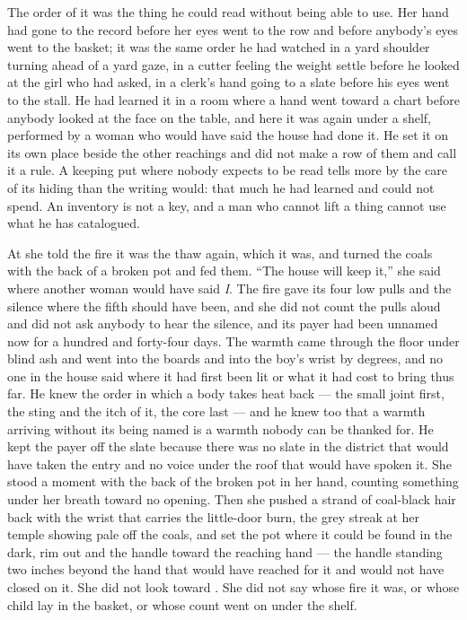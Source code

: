 The order of it was the thing he could read without being able to use. Her hand had gone to the record before her eyes went to the row and before anybody's eyes went to the basket; it was the same order he had watched in a yard shoulder turning ahead of a yard gaze, in a cutter feeling the weight settle before he looked at the girl who had asked, in a clerk's hand going to a slate before his eyes went to the stall. He had learned it in a room where a hand went toward a chart before anybody looked at the face on the table, and here it was again under a shelf, performed by a woman who would have said the house had done it. He set it on its own place beside the other reachings and did not make a row of them and call it a rule. A keeping put where nobody expects to be read tells more by the care of its hiding than the writing would: that much he had learned and could not spend. An inventory is not a key, and a man who cannot lift a thing cannot use what he has catalogued.

\scenebreak

At  she told the fire it was the thaw again, which it was, and turned the coals with the back of a broken pot and fed them. “The house will keep it,” she said where another woman would have said \emph{I}. The fire gave its four low pulls and the silence where the fifth should have been, and she did not count the pulls aloud and did not ask anybody to hear the silence, and its payer had been unnamed now for a hundred and forty-four days. The warmth came through the floor under blind ash and went into the boards and into the boy's wrist by degrees, and no one in the house said where it had first been lit or what it had cost to bring thus far. He knew the order in which a body takes heat back --- the small joint first, the sting and the itch of it, the core last --- and he knew too that a warmth arriving without its being named is a warmth nobody can be thanked for. He kept the payer off the slate because there was no slate in the district that would have taken the entry and no voice under the roof that would have spoken it. She stood a moment with the back of the broken pot in her hand, counting something under her breath toward no opening. Then she pushed a strand of coal-black hair back with the wrist that carries the little-door burn, the grey streak at her temple showing pale off the coals, and set the pot where it could be found in the dark, rim out and the handle toward the reaching hand --- the handle standing two inches beyond the hand that would have reached for it and would not have closed on it. She did not look toward . She did not say whose fire it was, or whose child lay in the basket, or whose count went on under the shelf.

